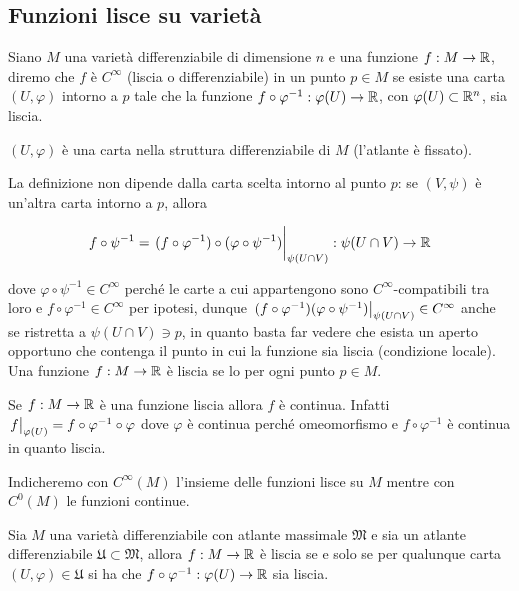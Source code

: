\subsection{Funzioni lisce su varietà}\label{s-sec:smooth-app-on-man}

Siano $ M $ una varietà differenziabile di dimensione $ n $ e una funzione $ f : M \to \mathbb{R} $, diremo che $ f $ è $ C^{\infty} $ (liscia o differenziabile) in un punto $ p \in M $ se esiste una carta $ (U,\varphi) $ intorno a $ p $ tale che la funzione $ f \circ \varphi^{-1} : \varphi(U) \to \mathbb{R} $, con $ \varphi(U) \subset \mathbb{R}^{n} $, sia liscia.


\begin{remark}
	$ (U,\varphi) $ è una carta nella struttura differenziabile di $ M $ (l'atlante è fissato).
\end{remark}

La definizione non dipende dalla carta scelta intorno al punto $ p $: se $ (V,\psi) $ è un'altra carta intorno a $ p $, allora

\begin{equation}
	f \circ \psi^{-1} = \eval{ (f \circ \varphi^{-1}) \circ (\varphi \circ \psi^{-1}) }_{\psi(U \cap V)} : \psi(U \cap V) \to \R
\end{equation}

dove $ \varphi \circ \psi^{-1} \in C^{\infty} $ perché le carte a cui appartengono sono $ C^{\infty} $-compatibili tra loro e $ f \circ \varphi^{-1} \in C^{\infty} $ per ipotesi, dunque $ \eval{ (f \circ \varphi^{-1})(\varphi \circ \psi^{-1}) }_{\psi(U \cap V)} \in C^{\infty} $ anche se ristretta a $ \psi(U \cap V) \ni p $, in quanto basta far vedere che esista un aperto opportuno che contenga il punto in cui la funzione sia liscia (condizione locale). \\
Una funzione $ f : M \to \mathbb{R} $ è liscia se lo per ogni punto $ p \in M $.

\begin{remark}
	Se $ f : M \to \mathbb{R} $ è una funzione liscia allora $ f $ è continua. Infatti $ \eval{f}_{\varphi(U)} = f \circ \varphi^{-1} \circ \varphi $ dove $ \varphi $ è continua perché omeomorfismo e $ f \circ \varphi^{-1} $ è continua in quanto liscia.
\end{remark}

Indicheremo con $ C^{\infty}(M) $ l'insieme delle funzioni lisce su $ M $ mentre con $ C^{0}(M) $ le funzioni continue.

\begin{definition}
	Sia $ M $ una varietà differenziabile con atlante massimale $ \mathfrak{M} $ e sia un atlante differenziabile $ \mathfrak{U} \subset \mathfrak{M} $, allora $ f : M \to \mathbb{R} $ è liscia se e solo se per qualunque carta $ (U,\varphi) \in \mathfrak{U} $ si ha che $ f \circ \varphi^{-1} : \varphi(U) \to \mathbb{R} $ sia liscia.
\end{definition}

